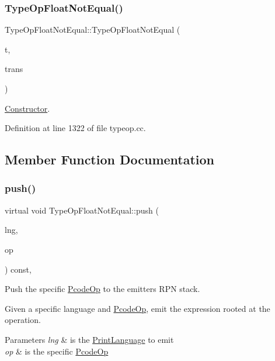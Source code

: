 \subsubsection{\texorpdfstring{TypeOpFloatNotEqual()}{TypeOpFloatNotEqual()}}
{\footnotesize\ttfamily Type\+Op\+Float\+Not\+Equal\+::\+Type\+Op\+Float\+Not\+Equal (\begin{DoxyParamCaption}\item[{\mbox{\hyperlink{class_type_factory}{Type\+Factory}} $\ast$}]{t,  }\item[{const \mbox{\hyperlink{class_translate}{Translate}} $\ast$}]{trans }\end{DoxyParamCaption})}



\mbox{\hyperlink{class_constructor}{Constructor}}. 



Definition at line 1322 of file typeop.\+cc.



\subsection{Member Function Documentation}
\mbox{\label{class_type_op_float_not_equal_a0245e015f66e8d6101416fdb0b796dd4}} 
\subsubsection{\texorpdfstring{push()}{push()}}
{\footnotesize\ttfamily virtual void Type\+Op\+Float\+Not\+Equal\+::push (\begin{DoxyParamCaption}\item[{\mbox{\hyperlink{class_print_language}{Print\+Language}} $\ast$}]{lng,  }\item[{const \mbox{\hyperlink{class_pcode_op}{Pcode\+Op}} $\ast$}]{op }\end{DoxyParamCaption}) const\hspace{0.3cm}{\ttfamily [inline]}, {\ttfamily [virtual]}}



Push the specific \mbox{\hyperlink{class_pcode_op}{Pcode\+Op}} to the emitter\textquotesingle{}s R\+PN stack. 

Given a specific language and \mbox{\hyperlink{class_pcode_op}{Pcode\+Op}}, emit the expression rooted at the operation. 
\begin{DoxyParams}{Parameters}
{\em lng} & is the \mbox{\hyperlink{class_print_language}{Print\+Language}} to emit \\
\hline
{\em op} & is the specific \mbox{\hyperlink{class_pcode_op}{Pcode\+Op}} \\
\hline
\end{DoxyParams}


